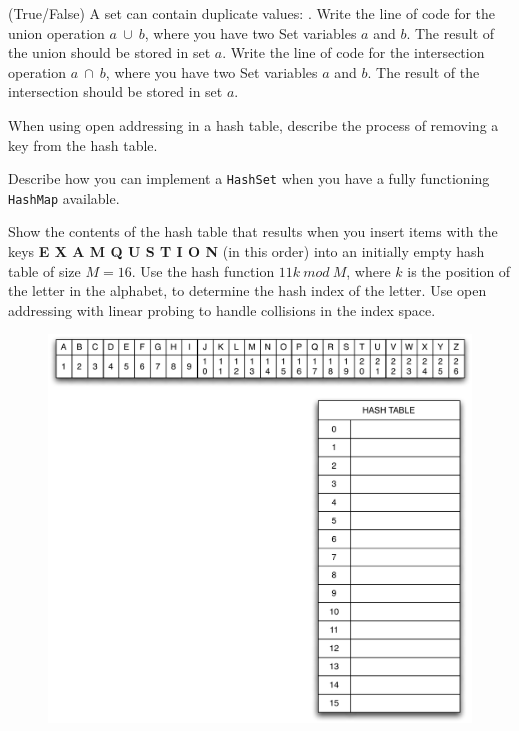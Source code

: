 \documentclass[11pt]{exam}
\begin{document}
\begin{questions}
\question[2] (True/False) A set can contain duplicate values: \makebox[2in]{\hrulefill}.
\question[2] Write the line of code for the union operation $a \: \cup \: b$, where you have two Set variables $a$ and $b$.  The result of the union should be stored in set $a$. \newline \makebox[2in]{\hrulefill}
\question[2] Write the line of code for the intersection operation $a \: \cap \: b$, where you have two Set variables $a$ and $b$.  The result of the intersection should be stored in set $a$. \newline \makebox[2in]{\hrulefill}

\question[3] When using open addressing in a hash table, describe the process of removing a key from the hash table.

\vspace{2in}

\question[3] Describe how you can implement a {\tt HashSet} when you have a fully functioning {\tt HashMap} available.

\newpage
\question[18] Show the contents of the hash table that results when you insert items with the keys {\bf E X A M Q U S T I O N} (in this order) into an initially empty hash table of size $M = 16$.   Use the hash function $11k \: mod \: M$, where $k$ is the position of the letter in the alphabet, to determine the hash index of the letter.   Use open addressing with linear probing to handle collisions in the index space.

\begin{figure}[htbp]
  \begin{centering}
    \includegraphics[width=6.5in]{hash_table_question}
  \end{centering}	
\end{figure}


\end{questions}
\end{document}
